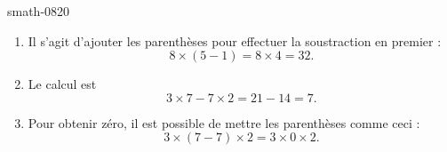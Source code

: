 
\begin{corrige}{smath-0820}

    \begin{enumerate}
        \item
            Il s'agit d'ajouter les parenthèses pour effectuer la soustraction en premier :
            \begin{equation}
                8\times (5-1)=8\times 4=32.
            \end{equation}
        \item
            Le calcul est
            \begin{equation}
                3\times 7-7\times 2=21-14=7.
            \end{equation}
        \item
            Pour obtenir zéro, il est possible de mettre les parenthèses comme ceci :
            \begin{equation}
                3\times (7-7)\times 2=3\times 0\times 2.
            \end{equation}
    \end{enumerate}

\end{corrige}
